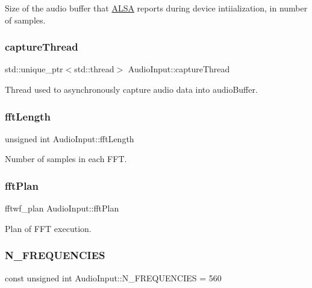 Size of the audio buffer that \hyperlink{classALSA}{A\+L\+SA} reports during device intiialization, in number of samples. \hypertarget{classAudioInput_ab113eec222bed512656f17a970082c62}{}\label{classAudioInput_ab113eec222bed512656f17a970082c62} 
\subsubsection{\texorpdfstring{capture\+Thread}{captureThread}}
{\ttfamily std\+::unique\+\_\+ptr$<$std\+::thread$>$ Audio\+Input\+::capture\+Thread\hspace{0.3cm}{\ttfamily [protected]}}

Thread used to asynchronously capture audio data into audio\+Buffer. \hypertarget{classAudioInput_a5b31598e9106da62d86d11d69a9dbd20}{}\label{classAudioInput_a5b31598e9106da62d86d11d69a9dbd20} 
\subsubsection{\texorpdfstring{fft\+Length}{fftLength}}
{\ttfamily unsigned int Audio\+Input\+::fft\+Length\hspace{0.3cm}{\ttfamily [protected]}}

Number of samples in each F\+FT. \hypertarget{classAudioInput_a9797094e75625173beae7e89497248b2}{}\label{classAudioInput_a9797094e75625173beae7e89497248b2} 
\subsubsection{\texorpdfstring{fft\+Plan}{fftPlan}}
{\ttfamily fftwf\+\_\+plan Audio\+Input\+::fft\+Plan\hspace{0.3cm}{\ttfamily [protected]}}

Plan of F\+FT execution. \hypertarget{classAudioInput_a4be6c19fca6626b2ccee1eeca458f7c8}{}\label{classAudioInput_a4be6c19fca6626b2ccee1eeca458f7c8} 
\subsubsection{\texorpdfstring{N\+\_\+\+F\+R\+E\+Q\+U\+E\+N\+C\+I\+ES}{N\_FREQUENCIES}}
{\ttfamily const unsigned int Audio\+Input\+::\+N\+\_\+\+F\+R\+E\+Q\+U\+E\+N\+C\+I\+ES = 560\hspace{0.3cm}{\ttfamily [static]}}

